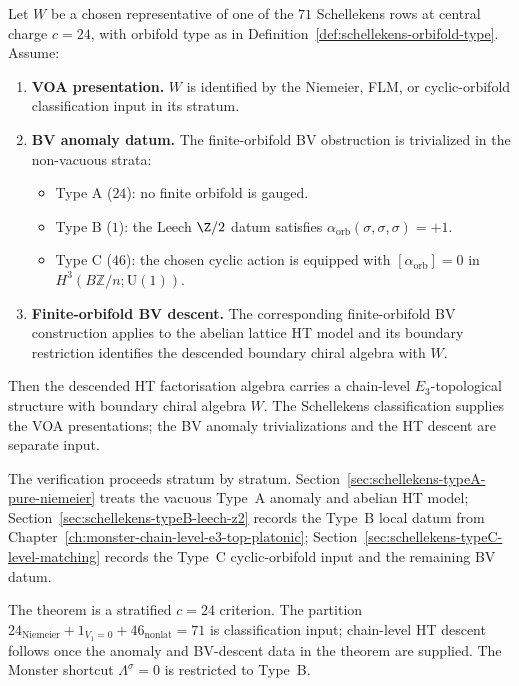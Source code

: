 \begin{theorem}
\label{thm:schellekens-71-all-alpha-zero}
Let $W$ be a chosen representative of one of the $71$ Schellekens rows
at central charge $c = 24$, with orbifold type as in
Definition~\ref{def:schellekens-orbifold-type}. Assume:
\begin{enumerate}[label=\textup{(\roman*)}]
\item \textbf{VOA presentation.} $W$ is identified by the Niemeier,
FLM, or cyclic-orbifold classification input in its stratum.
\item \textbf{BV anomaly datum.} The finite-orbifold BV obstruction is
trivialized in the non-vacuous strata:
 \begin{itemize}
 \item Type A ($24$): no finite orbifold is gauged.
 \item Type B ($1$): the Leech $\Z/2$ datum satisfies
 $\alpha_{\mathrm{orb}}(\sigma,\sigma,\sigma)=+1$.
 \item Type C ($46$): the chosen cyclic action is equipped with
 $[\alpha_{\mathrm{orb}}]=0$ in
 $H^3(B\mathbb{Z}/n;\mathrm{U}(1))$.
 \end{itemize}
\item \textbf{Finite-orbifold BV descent.} The corresponding
finite-orbifold BV construction applies to the abelian lattice HT
model and its boundary restriction identifies the descended boundary
chiral algebra with $W$.
\end{enumerate}
Then the descended HT factorisation algebra carries a chain-level
$E_3$-topological structure with boundary chiral algebra $W$. The
Schellekens classification supplies the VOA presentations; the BV
anomaly trivializations and the HT descent are separate input.
\end{theorem}

The verification proceeds stratum by stratum.
Section~\ref{sec:schellekens-typeA-pure-niemeier} treats the vacuous
Type~A anomaly and abelian HT model;
Section~\ref{sec:schellekens-typeB-leech-z2} records the Type~B local
datum from Chapter~\ref*{ch:monster-chain-level-e3-top-platonic};
Section~\ref{sec:schellekens-typeC-level-matching} records the Type~C
cyclic-orbifold input and the remaining BV datum.

\begin{remark}
\label{rem:schellekens-stratified-scope}
The theorem is a stratified $c=24$ criterion. The partition
$24_{\mathrm{Niemeier}} + 1_{V_1=0} + 46_{\mathrm{nonlat}} = 71$ is
classification input; chain-level HT descent follows once
the anomaly and BV-descent data in the theorem are supplied. The
Monster shortcut $\Lambda^\sigma = 0$ is restricted to Type~B.
\end{remark}


